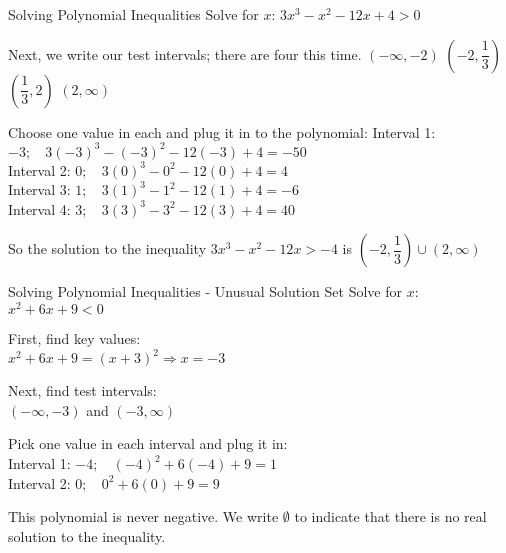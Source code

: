 \documentclass{beamer}
\newcommand{\fp}[1]{\left({#1}\right)} %
\begin{document}
\begin{frame}[t]{Solving Polynomial Inequalities}
Solve for $x$: $3x^3 - x^2 - 12x + 4 > 0$

Next, we write our test intervals; there are four this time.
$(-\infty, -2)$ \hspace{0.5in} $\fp{-2, \dfrac13}$ \hspace{0.5in} $\fp{\dfrac13, 2}$ \hspace{0.5in} $(2, \infty)$

\pause

Choose one value in each and plug it in to the polynomial:
\pause Interval 1: $-3; \; \text{ } 3(-3)^3 - (-3)^2 - 12(-3) + 4 = -50$ \\
\pause Interval 2: $0; \; \text{ } 3(0)^3 - 0^2 - 12(0) + 4 = 4$ \\
\pause Interval 3: $1; \; \text{ } 3(1)^3 - 1^2 - 12(1) + 4 = -6$ \\
\pause Interval 4: $3; \; \text{ } 3(3)^3 - 3^2 - 12(3) + 4 = 40$

\pause

So the solution to the inequality $3x^3 - x^2 - 12x > -4$ is $\fp{-2, \dfrac13} \cup (2, \infty)$
\end{frame}

\begin{frame}[t]{Solving Polynomial Inequalities - Unusual Solution Set}
Solve for $x$: $x^2 + 6x + 9 < 0$

\pause

First, find key values: \\
$x^2 + 6x + 9 = (x+3)^2 \Rightarrow x = -3$

\pause

Next, find test intervals: \\
$(-\infty, -3)$ and $(-3, \infty)$

\pause

Pick one value in each interval and plug it in: \\
\pause Interval 1: $-4; \; \text{ } (-4)^2 + 6(-4) + 9 = 1$ \\
\pause Interval 2: $0; \; \text{ } 0^2 + 6(0) + 9 = 9$

\pause

This polynomial is never negative. We write $\emptyset$ to indicate that there is no real solution to the inequality.
\end{frame}
\end{document}
